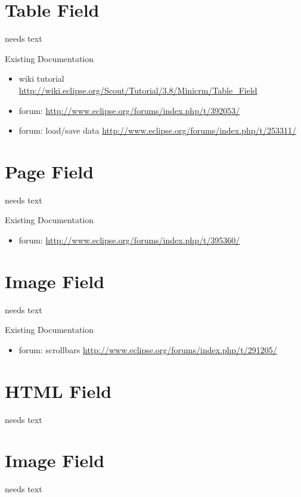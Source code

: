 \documentclass[a4paper,10pt,twoside]{book}
\begin{document}
\section{Table Field}
needs text

\noindent Existing Documentation
\begin{itemize}
  \item wiki tutorial \url{http://wiki.eclipse.org/Scout/Tutorial/3.8/Minicrm/Table_Field}
  \item forum: \url{http://www.eclipse.org/forums/index.php/t/392053/}
  \item forum: load/save data \url{http://www.eclipse.org/forums/index.php/t/253311/}
\end{itemize}

\section{Page Field}
needs text

\noindent Existing Documentation
\begin{itemize}
  \item forum: \url{http://www.eclipse.org/forums/index.php/t/395360/}
\end{itemize}

\section{Image Field}
needs text

\noindent Existing Documentation
\begin{itemize}
  \item forum: scrollbars \url{http://www.eclipse.org/forums/index.php/t/291205/}
\end{itemize}

\section{HTML Field}
needs text

\section{Image Field}
needs text
\end{document}
